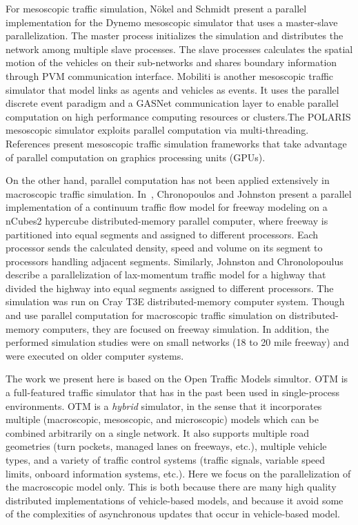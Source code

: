  For mesoscopic traffic simulation, N{\"o}kel and Schmidt present a parallel implementation for the Dynemo mesoscopic simulator that uses a master-slave parallelization. The master process initializes the simulation and distributes the network among multiple slave processes. The slave processes calculates the spatial motion of the vehicles on their sub-networks and shares boundary information through PVM communication interface. Mobiliti \cite{chan2018mobiliti} is another mesoscopic traffic simulator that model links as agents and vehicles as events. It uses the parallel discrete event paradigm and a GASNet communication layer to enable parallel computation on high performance computing resources or clusters.The POLARIS mesoscopic simulator \cite{auld2016polaris} exploits parallel computation via multi-threading. References  \cite{xu2014mesoscopic,song2017supporting,strippgen2009multi} present mesoscopic traffic simulation frameworks that take advantage of parallel computation on graphics processing units (GPUs). 

On the other hand, parallel computation has not been applied extensively in macroscopic traffic simulation. In~\cite{chronopoulos1998real}, Chronopoulos and
Johnston present a parallel implementation of a continuum traffic flow model
for freeway modeling on a
nCubes2 hypercube distributed-memory parallel computer, where freeway is
partitioned into equal segments and assigned to different processors.
Each processor sends the calculated density, speed and volume on its segment to processors handling adjacent segments. Similarly, Johnston and Chronolopoulus \cite{johnston1999parallelization} describe a parallelization of lax-momentum traffic model for a highway that divided the highway into equal segments assigned to different processors. The simulation was run on Cray T3E 
distributed-memory computer system. Though \cite{chronopoulos1998real} and \cite{johnston1999parallelization} use parallel computation for macroscopic traffic simulation on distributed-memory computers, they are focused on freeway simulation. In addition, the performed simulation studies were on small networks (18 to 20 mile freeway) and were executed on older computer systems.

The work we present here is based on the Open Traffic Models simultor. OTM is a full-featured traffic simulator that has in the past been used in single-process environments. OTM is a \textit{hybrid} simulator, in the sense that it incorporates multiple (macroscopic, mesoscopic, and microscopic) models which can be combined arbitrarily on a single network. It also supports multiple road geometries (turn pockets, managed lanes on freeways, etc.), multiple vehicle types, and a variety of traffic control systems (traffic signals, variable speed limits, onboard information systems, etc.). Here we focus on the parallelization of the macroscopic model only. This is both because there are many high quality distributed implementations of vehicle-based models, and because it avoid some of the complexities of asynchronous updates that occur in vehicle-based model.
